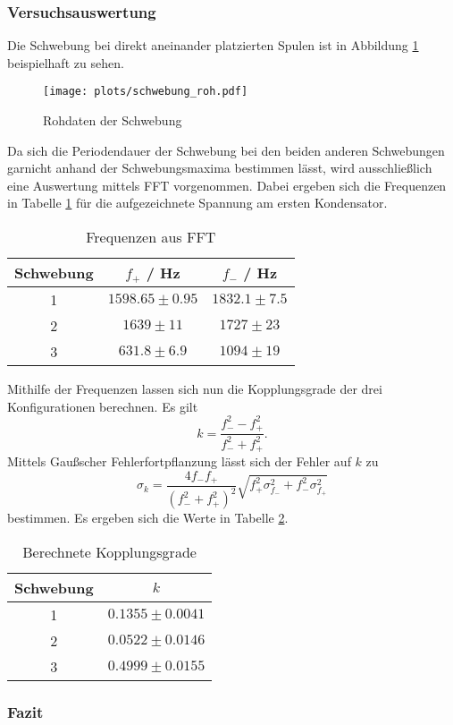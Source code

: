\subsubsection{Versuchsauswertung}

Die Schwebung bei direkt aneinander platzierten Spulen ist in Abbildung \ref{abb:schwebung_roh} beispielhaft zu sehen.

\begin{figure}[H]
\centering
\texttt{[image: plots/schwebung\_roh.pdf]}
\caption{Rohdaten der Schwebung}
\label{abb:schwebung_roh}
\end{figure}

Da sich die Periodendauer der Schwebung bei den beiden anderen Schwebungen garnicht anhand der Schwebungsmaxima bestimmen lässt, wird ausschließlich eine Auswertung mittels FFT vorgenommen. Dabei ergeben sich die Frequenzen in Tabelle \ref{tab:freq_schweb} für die aufgezeichnete Spannung am ersten Kondensator.

\begin{table}[H]
\centering
\begin{tabular}{c|c|c}
Schwebung & $f_+$ / Hz & $f_-$ / Hz \\
\hline
1 & $1598.65 \pm 0.95$ & $1832.1 \pm 7.5$ \\
2 & $1639 \pm 11$ & $1727 \pm 23$ \\
3 & $631.8 \pm 6.9$ & $1094 \pm 19$
\end{tabular}
\caption{Frequenzen aus FFT}
\label{tab:freq_schweb}
\end{table}

Mithilfe der Frequenzen lassen sich nun die Kopplungsgrade der drei Konfigurationen berechnen. Es gilt
$$k = \frac{f_-^2 - f_+^2}{f_-^2 + f_+^2}.$$
Mittels Gaußscher Fehlerfortpflanzung lässt sich der Fehler auf $k$ zu
$$\sigma_k = \frac{4f_-f_+}{(f_-^2+f_+^2)^2} \sqrt{f_+^2 \sigma_{f_-}^2 + f_-^2 \sigma_{f_+}^2}$$
bestimmen. Es ergeben sich die Werte in Tabelle \ref{tab:kopplung}.

\begin{table}[H]
\centering
\begin{tabular}{c|c}
Schwebung & $k$ \\
\hline
1 & $0.1355 \pm 0.0041$ \\
2 & $0.0522 \pm 0.0146$ \\
3 & $0.4999 \pm 0.0155$
\end{tabular}
\caption{Berechnete Kopplungsgrade}
\label{tab:kopplung}
\end{table}


\subsubsection{Fazit}